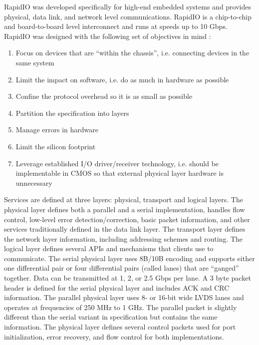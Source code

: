 RapidIO was developed specifically for high-end embedded systems and provides physical, data link, and network level communications. RapidIO is a chip-to-chip and board-to-board level interconnect and runs at speeds up to 10 Gbps. RapidIO was designed with the following set of objectives in mind \cite{ref:2005-fuller-rapidio_the_embedded_interconnect}:
\begin{enumerate}
	\item Focus on devices that are ``within the chassis'', i.e. connecting devices in the same system
	\item Limit the impact on software, i.e. do as much in hardware as possible
	\item Confine the protocol overhead so it is as small as possible
	\item Partition the specification into layers
	\item Manage errors in hardware
	\item Limit the silicon footprint
	\item Leverage established I/O driver/receiver technology, i.e. should be implementable in CMOS so that external physical layer hardware is unnecessary
\end{enumerate}
Services are defined at three layers: physical, transport and logical layers. The physical layer defines both a parallel and a serial implementation, handles flow control, low-level error detection/correction, basic packet information, and other services traditionally defined in the data link layer. The transport layer defines the network layer information, including addressing schemes and routing. The logical layer defines several APIs and mechanisms that clients use to communicate. \cite{ref:2005-fuller-rapidio_the_embedded_interconnect}
The serial physical layer uses 8B/10B encoding and supports either one differential pair or four differential pairs (called lanes) that are ``ganged'' together. Data can be transmitted at 1, 2, or 2.5 Gbps per lane. A 3 byte packet header is defined for the serial physical layer and includes ACK and CRC information. The parallel physical layer uses 8- or 16-bit wide LVDS lanes and operates at frequencies of 250 MHz to 1 GHz. The parallel packet is slightly different than the serial variant in specification but contains the same information. The physical layer defines several control packets used for port initialization, error recovery, and flow control for both implementations. \cite{ref:2005-fuller-rapidio_the_embedded_interconnect}
